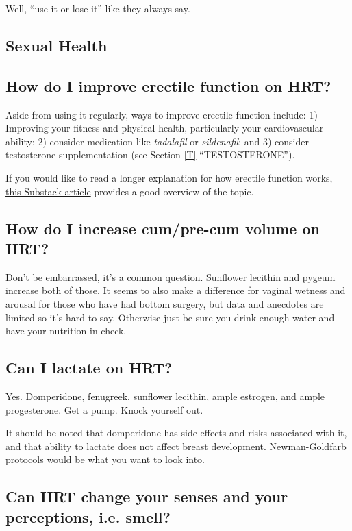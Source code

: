 \documentclass{article}
\begin{document}
Well, “use it or lose it” like they always say.

\subsection*{Sexual Health}

\subsection{How do I improve erectile function on HRT?}\label{11-20}

Aside from using it regularly, ways to improve erectile function include: 1) Improving your fitness and physical health, particularly your cardiovascular ability; 2) consider medication like \textit{tadalafil} or \textit{sildenafil}; and 3) consider testosterone supplementation (see Section \ref{T} “TESTOSTERONE”).

If you would like to read a longer explanation for how erectile function works, \href{https://stainedglasswoman.substack.com/p/how-to-maintain-your-penis-function}{this Substack article} provides a good overview of the topic.

\subsection{How do I increase cum/pre-cum volume on HRT?}

Don’t be embarrassed, it’s a common question. Sunflower lecithin and pygeum increase both of those. It seems to also make a difference for vaginal wetness and arousal for those who have had bottom surgery, but data and anecdotes are limited so it’s hard to say. Otherwise just be sure you drink enough water and have your nutrition in check.

\subsection{Can I lactate on HRT?}

Yes. Domperidone, fenugreek, sunflower lecithin, ample estrogen, and ample progesterone. Get a pump. Knock yourself out.

It should be noted that domperidone has side effects and risks associated with it, and that ability to lactate does not affect breast development. Newman-Goldfarb protocols would be what you want to look into.

\subsection{Can HRT change your senses and your perceptions, i.e. smell?}
\end{document}
